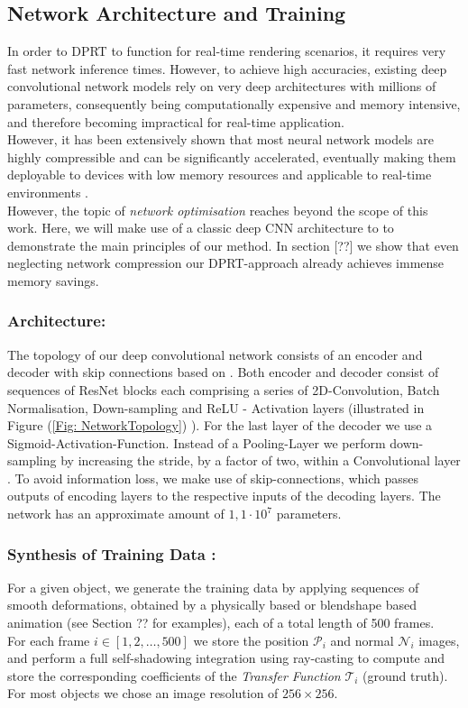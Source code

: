 \subsection{ Network Architecture and Training}
In order to DPRT to function for real-time rendering scenarios, it requires very fast network inference times. However, to achieve high accuracies, existing deep convolutional network models rely on very deep architectures with millions of parameters, consequently being computationally expensive and memory intensive, and therefore becoming impractical for real-time application. \\
However, it has been extensively shown that most neural network models are highly compressible and can be significantly accelerated, eventually making them deployable to devices with low memory resources and applicable to real-time environments \cite{Deep_Compression, Survey_NN_Compression}.
\\
However, the topic of \textit{network optimisation} reaches beyond the scope of this work. Here, we will make use of a classic deep CNN architecture to to demonstrate the main principles of our method. In section [??] we show that even neglecting network compression our DPRT-approach already achieves immense memory savings. 
\subsubsection*{Architecture: \\} 
The topology of our deep convolutional network consists of an encoder and decoder with skip connections based on \cite{U-Net}. Both encoder and decoder consist of sequences of ResNet blocks \cite{ResNet} each comprising a series of 2D-Convolution, Batch Normalisation, Down-sampling and ReLU - Activation layers (illustrated in Figure (\ref{Fig: NetworkTopology}) ). For the last layer of the decoder we use a Sigmoid-Activation-Function. Instead of a Pooling-Layer we perform down-sampling by increasing the stride, by a factor of two, within a Convolutional layer \cite{StridingConv}. To avoid information loss,  we make use of skip-connections, which passes outputs of encoding layers to the respective inputs of the decoding layers. The network has an approximate amount of $1,1 \cdot 10^7$ parameters. \\
\subsubsection*{Synthesis of Training Data :\\}
For a given object, we generate the training data by applying sequences of smooth deformations, obtained by a physically based or blendshape based animation (see Section ?? for examples), each of a total length of 500 frames. 
\\
For each frame $i \in [1,2,\dots,500]$ we store the position $\mathcal{P}_i$  and normal $\mathcal{N}_i$ images, and perform a full self-shadowing integration using ray-casting to compute and store the corresponding coefficients of the \textit{Transfer Function} $\mathcal{T}_i$ (ground truth).
\\
For most objects we chose an image resolution of $256 \times 256$. 
